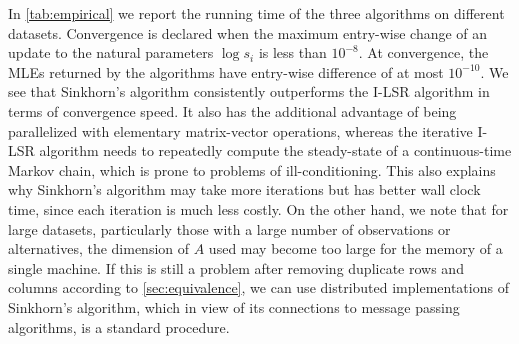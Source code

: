 In \cref{tab:empirical} we report the running time of the three algorithms on different
datasets. Convergence is declared when the maximum entry-wise change
of an update to the natural parameters $\log s_{i}$ is less than
$10^{-8}$. At convergence, the MLEs returned by the algorithms have entry-wise difference of at most $10^{-10}$. %
We see that Sinkhorn's algorithm consistently outperforms
the I-LSR algorithm in terms of convergence speed. It also has the additional advantage of being parallelized with
elementary matrix-vector operations, whereas the iterative I-LSR algorithm needs to repeatedly
compute the steady-state of a continuous-time Markov chain, which
is prone to problems of ill-conditioning. This also explains why Sinkhorn's algorithm may take more iterations but has better wall clock time, since each iteration is much less costly. On the other hand, we note
that for large datasets, particularly those with a large number of
observations or alternatives, the dimension of $A$ used
may become too large for the memory of a single machine. If this is still a problem after removing duplicate rows and columns according to \cref{sec:equivalence}, we can use distributed implementations of Sinkhorn's algorithm, which in view of its connections to message passing algorithms, is a standard procedure.
